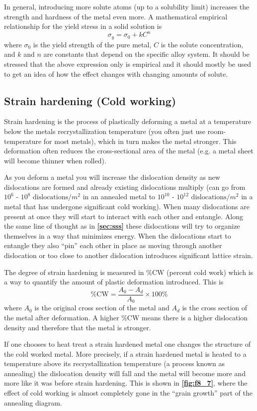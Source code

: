 In general, introducing more solute atoms (up to a solubility limit) increases the strength and hardness of the metal even more. A mathematical empirical relationship for the yield stress in a solid solution is
\[ 
\sigma_y = \sigma_0 + k C^{n}
\]
where $\sigma_0$ is the yield strength of the pure metal, $C$ is the solute concentration, and $k$ and $n$ are constants that depend on the specific alloy system. It should be stressed that the above expression only is empirical and it should mostly be used to get an idea of how the effect changes with changing amounts of solute. 

\subsection{Strain hardening (Cold working)}
Strain hardening is the process of plastically deforming a metal at a temperature below the metals recrystallization temperature (you often just use room-temperature for most metals), which in turn makes the metal stronger. This deformation often reduces the cross-sectional area of the metal (e.g. a metal sheet will become thinner when rolled).

As you deform a metal you will increase the dislocation density as new dislocations are formed and already existing dislocations multiply (can go from $10^6$ - $10^8$ $\text{dislocations} / \unit{m^2} $ in an annealed metal to $10^10$ - $10^12$ $\text{dislocations} / \unit{m^2} $ in a metal that has undergone significant cold working). When many dislocations are present at once they will start to interact with each other and entangle. Along the same line of thought as in \textbf{\autoref{sec:sss}} these dislocations will try to organize themselves in a way that minimizes energy. When the dislocations start to entangle they also ``pin'' each other in place as moving through another dislocation or too close to another dislocation introduces significant lattice strain.

The degree of strain hardening is measured in $\% \mathrm{CW}$ (percent cold work) which is a way to quantify the amount of plastic deformation introduced. This is
\[ 
\% \mathrm{CW} = \frac{A_0 - A_d}{A_0} \times 100 \%
\]
where $A_0$ is the original cross section of the metal and $A_d$ is the cross section of the metal after deformation. A higher $\% \mathrm{CW}$ means there is a higher dislocation density and therefore that the metal is stronger.

If one chooses to heat treat a strain hardened metal one changes the structure of the cold worked metal. More precisely, if a strain hardened metal is heated to a temperature above its recrystallization temperature (a process known as annealing) the dislocation density will fall and the metal will become more and more like it was before strain hardening. This is shown in \textbf{\autoref{fig:f8_7}}, where the effect of cold working is almost completely gone in the ``grain growth'' part of the annealing diagram. 

